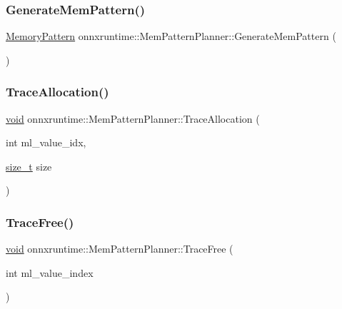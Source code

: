 \subsubsection{\texorpdfstring{Generate\+Mem\+Pattern()}{GenerateMemPattern()}}
{\footnotesize\ttfamily \mbox{\hyperlink{classonnxruntime_1_1MemoryPattern}{Memory\+Pattern}} onnxruntime\+::\+Mem\+Pattern\+Planner\+::\+Generate\+Mem\+Pattern (\begin{DoxyParamCaption}{ }\end{DoxyParamCaption})\hspace{0.3cm}{\ttfamily [inline]}}

\mbox{\label{classonnxruntime_1_1MemPatternPlanner_a024ca843effacf25fa1fe730c2be73a3}} 
\subsubsection{\texorpdfstring{Trace\+Allocation()}{TraceAllocation()}}
{\footnotesize\ttfamily \mbox{\hyperlink{mlasi_8h_a88f941d423cb2a819b70a1358982b1a6}{void}} onnxruntime\+::\+Mem\+Pattern\+Planner\+::\+Trace\+Allocation (\begin{DoxyParamCaption}\item[{int}]{ml\+\_\+value\+\_\+idx,  }\item[{\mbox{\hyperlink{mlasi_8h_a503efbc1c6e50825320ad909366b78ab}{size\+\_\+t}}}]{size }\end{DoxyParamCaption})\hspace{0.3cm}{\ttfamily [inline]}}

\mbox{\label{classonnxruntime_1_1MemPatternPlanner_a5ec1e13a1d5b467ccce1582b114edc8a}} 
\subsubsection{\texorpdfstring{Trace\+Free()}{TraceFree()}}
{\footnotesize\ttfamily \mbox{\hyperlink{mlasi_8h_a88f941d423cb2a819b70a1358982b1a6}{void}} onnxruntime\+::\+Mem\+Pattern\+Planner\+::\+Trace\+Free (\begin{DoxyParamCaption}\item[{int}]{ml\+\_\+value\+\_\+index }\end{DoxyParamCaption})\hspace{0.3cm}{\ttfamily [inline]}}



